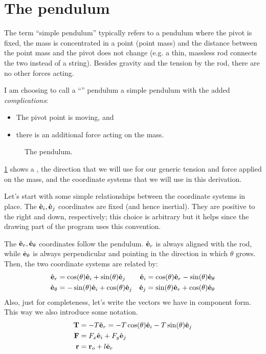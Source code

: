 \documentclass{article}
\begin{document}
\section{The \ntsp pendulum}
The term ``simple pendulum'' typically refers to a pendulum where the pivot is fixed, the mass is concentrated in a point (point mass) and the distance between the point mass and the pivot does not change (e.g. a thin, massless rod connects the two instead of a string). Besides gravity and the tension by the rod, there are no other forces acting.

I am choosing to call a ``\ntsp'' pendulum a simple pendulum with the added \emph{complications}:
\begin{itemize}
  \item The pivot point is moving, and
  \item there is an additional force acting on the mass.
\end{itemize}

\begin{figure}[ht]
  \centering
  \caption{The \ntsp pendulum.}
  \label{f:ntsp}
\end{figure}

\cref{f:ntsp} shows a \ntsp, the direction that we will use for our generic tension and force applied on the mass, and the coordinate systems that we will use in this derivation.

Let's start with some simple relationships between the coordinate systems in place. The ${\hat{\mathbf{e}}_i,\hat{\mathbf{e}}_j}$ coordinates are fixed (and hence inertial). They are positive to the right and down, respectively; this choice is arbitrary but it helps since the drawing part of the program uses this convention.

The ${\hat{\mathbf{e}}_r,\hat{\mathbf{e}}_\theta}$ coordinates follow the pendulum. $\hat{\mathbf{e}}_r$ is always aligned with the rod, while $\hat{\mathbf{e}}_\theta$ is always perpendicular and pointing in the direction in which $\theta$ grows. Then, the two coordinate systems are related by:
\begin{equation}
\begin{aligned}
  \hat{\mathbf{e}}_r &= \cos(\theta)\hat{\mathbf{e}}_i+\sin(\theta)\hat{\mathbf{e}}_j & \hat{\mathbf{e}}_i &= \cos(\theta)\hat{\mathbf{e}}_r - \sin(\theta)\hat{\mathbf{e}}_\theta \\
  \hat{\mathbf{e}}_\theta &=-\sin(\theta)\hat{\mathbf{e}}_i+\cos(\theta)\hat{\mathbf{e}}_j & \hat{\mathbf{e}}_j &= \sin(\theta)\hat{\mathbf{e}}_r + \cos(\theta)\hat{\mathbf{e}}_\theta
\end{aligned}
\label{e:cs}
\end{equation}
Also, just for completeness, let's write the vectors we have in component form. This way we also introduce some notation.
\begin{align}
  \mathbf{T}&=-T\hat{\mathbf{e}}_r = -T\cos(\theta)\hat{\mathbf{e}}_i-T\sin(\theta)\hat{\mathbf{e}}_j\\
  \mathbf{F}&=F_x\hat{\mathbf{e}}_i+F_y\hat{\mathbf{e}}_j\\
  \mathbf{r}&=\mathbf{r}_{o}+l\hat{\mathbf{e}}_r \label{e:pos}
\end{align}
\end{document}
